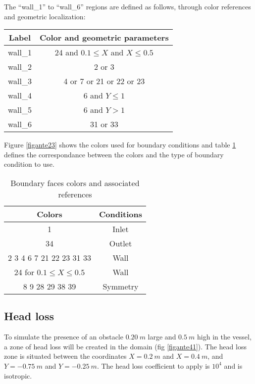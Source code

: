 The ``wall\_1'' to ``wall\_6'' regions are defined as follows, through color
references and geometric localization:
\begin{center}
\begin{tabular}{c|c}
Label & Color and geometric parameters \\
\hline
wall\_1 & 24 and $0.1\leqslant X$ and $X\leqslant 0.5$ \\
wall\_2 & 2 or 3 \\
wall\_3 & 4 or 7 or 21 or 22 or 23 \\
wall\_4 & 6 and $Y\leqslant1$ \\
wall\_5 & 6 and $Y>1$ \\
wall\_6 & 31 or 33 \\
\end{tabular}
\end{center}

Figure \ref{figante23} shows the colors used for boundary conditions and 
table \ref{tabante41} defines the correspondance between the colors and  
the type of boundary condition to use.

\begin{table}[htp]
\begin{center}
\begin{tabular}{|c|c|} 
\hline
Colors & Conditions \\
\hline
1 & Inlet \\
\hline
34 & Outlet \\
\hline
2 3 4 6 7 21 22 23 31 33 & Wall \\
\hline
24 for $0.1 \leq X \leq 0.5$ & Wall \\
\hline
8 9 28 29 38 39 & Symmetry \\
\hline
\end{tabular}
\caption{Boundary faces colors and associated references}
\label{tabante41}
\end{center}
\end{table}



	\subsection{Head loss}

To simulate the presence of an obstacle $0.20\ m$ large and $0.5\ m$ high in the
vessel, a zone of head loss will be created in the domain (fig \ref{figante41}).
The head loss zone is situated between the coordinates $X=0.2\ m$ and $X=0.4\ m$, 
and $Y=-0.75\ m$ and $Y=-0.25\ m$. The head loss coefficient to apply is $10^4$
and is isotropic.

